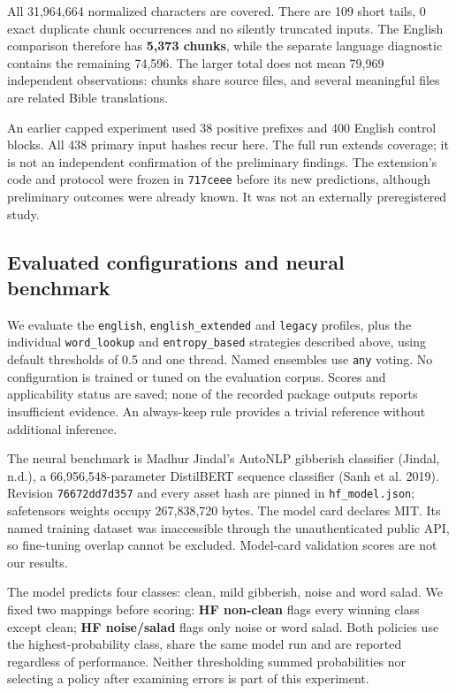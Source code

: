 \documentclass[10pt,a4paper,twocolumn]{article}
\begin{document}
All 31,964,664 normalized characters are covered. There are 109 short
tails, 0 exact duplicate chunk occurrences and no silently truncated
inputs. The English comparison therefore has \textbf{5,373 chunks},
while the separate language diagnostic contains the remaining 74,596.
The larger total does not mean 79,969 independent observations: chunks
share source files, and several meaningful files are related Bible
translations.

An earlier capped experiment used 38 positive prefixes and 400 English
control blocks. All 438 primary input hashes recur here. The full run
extends coverage; it is not an independent confirmation of the
preliminary findings. The extension's code and protocol were frozen in
\texttt{717ceee} before its new predictions, although preliminary
outcomes were already known. It was not an externally preregistered
study.

\subsection{Evaluated configurations and neural
benchmark}\label{evaluated-configurations-and-neural-benchmark}

We evaluate the \texttt{english}, \texttt{english\_extended} and
\texttt{legacy} profiles, plus the individual \texttt{word\_lookup} and
\texttt{entropy\_based} strategies described above, using default
thresholds of 0.5 and one thread. Named ensembles use \texttt{any}
voting. No configuration is trained or tuned on the evaluation corpus.
Scores and applicability status are saved; none of the recorded package
outputs reports insufficient evidence. An always-keep rule provides a
trivial reference without additional inference.

The neural benchmark is Madhur Jindal's AutoNLP gibberish classifier
(Jindal, n.d.), a 66,956,548-parameter DistilBERT sequence classifier
(Sanh et al. 2019). Revision \texttt{76672dd7d357} and every asset hash
are pinned in \texttt{hf\_model.json}; safetensors weights occupy
267,838,720 bytes. The model card declares MIT. Its named training
dataset was inaccessible through the unauthenticated public API, so
fine-tuning overlap cannot be excluded. Model-card validation scores are
not our results.

The model predicts four classes: clean, mild gibberish, noise and word
salad. We fixed two mappings before scoring: \textbf{HF non-clean} flags
every winning class except clean; \textbf{HF noise/salad} flags only
noise or word salad. Both policies use the highest-probability class,
share the same model run and are reported regardless of performance.
Neither thresholding summed probabilities nor selecting a policy after
examining errors is part of this experiment.
\end{document}

